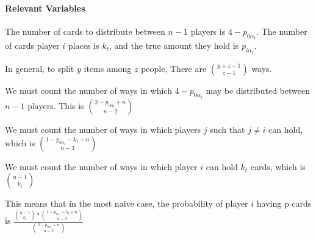 \documentclass[letterpaper,11pt]{report}
\begin{document}
\paragraph*{Relevant Variables} The number of cards to distribute between $n-1$ players is $4-p_{0 \alpha_{t}}$. The number of cards player $i$ places is $k_t$, and the true amount they hold is $p_{i \alpha_t}$.
\begin{description}
    \item In general, to split $y$ items among $z$ people, There are ${y+z-1 \choose z-1}$ ways.
    \item We must count the number of ways in which $4-p_{0 \alpha_{t}}$ may be distributed between $n-1$ players. This is ${2-p_{0 \alpha_{t}} + n \choose n-2}$
    \item We must count the number of ways in which players $j$ such that $j\neq i$ can hold, which is ${1-p_{0 \alpha_{t}} - k_t + n \choose n-3}$ 
    \item We must count the number of ways in which player $i$ can hold $k_t$ cards, which is ${n-1 \choose k_t}$
    \linebreak
    \item This means that in the most naive case, the probability of player $i$ having p cards is  $\frac{{n-1 \choose k_t}\ast{1-p_{0 \alpha_{t}} - k_t + n \choose n-3}}{{2-p_{0 \alpha_{t}} + n \choose n-2}}$
\end{description}
\end{document}
